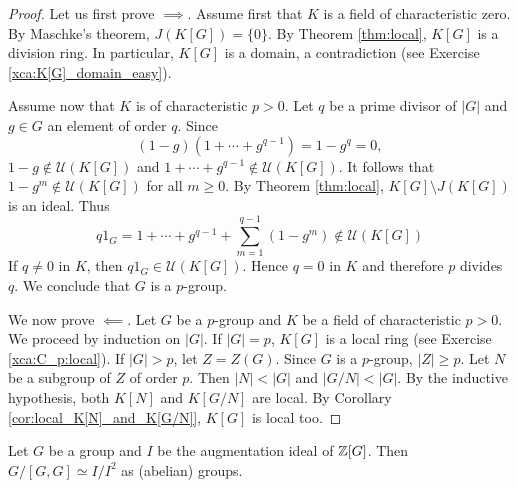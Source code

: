 \begin{proof}
    Let us first prove $\implies$. Assume first that $K$ is a field of characteristic zero. 
    By Maschke's theorem, $J(K[G])=\{0\}$. By Theorem \ref{thm:local}, 
    $K[G]$ is a division ring. In particular, $K[G]$ is a domain, 
    a contradiction (see Exercise \ref{xca:K[G]_domain_easy}).

    Assume now that $K$ is of characteristic $p>0$. 
    Let $q$ be a prime divisor of $|G|$ and $g\in G$ an element of order $q$. 
    Since 
    \[
    (1-g)(1+\cdots+g^{q-1})=1-g^q=0,
    \]
    $1-g\not\in\mathcal{U}(K[G])$ and $1+\cdots+g^{q-1}\not\in\mathcal{U}(K[G])$. It follows
    that $1-g^m\not\in\mathcal{U}(K[G])$ for all $m\geq0$. By Theorem \ref{thm:local}, 
    $K[G]\setminus J(K[G])$ is an ideal. Thus  
    \[
    q1_G=1+\cdots+g^{q-1}+\sum_{m=1}^{q-1}(1-g^m)\not\in\mathcal{U}(K[G])
    \]
    If $q\ne 0$ in $K$, then $q1_G\in\mathcal{U}(K[G])$. Hence $q=0$ in $K$ and
    therefore $p$ divides $q$. We conclude that $G$ is a $p$-group. 

    We now prove $\impliedby$. Let $G$ be a $p$-group and $K$ be a field of characteristic $p>0$. We proceed
    by induction on $|G|$. 
    If $|G|=p$, $K[G]$ is a local ring (see Exercise \ref{xca:C_p:local}).
    If $|G|>p$, let $Z=Z(G)$. Since $G$ is a $p$-group, $|Z|\geq p$. Let $N$ be a subgroup of $Z$ of order $p$. 
    Then $|N|<|G|$ and $|G/N|<|G|$. By the inductive hypothesis, both 
    $K[N]$ and $K[G/N]$ are local. By Corollary \ref{cor:local_K[N]_and_K[G/N]}, $K[G]$ is local too. 
\end{proof}


\begin{theorem}[Hurewicz]
    \label{thm:Hurewicz}
    Let $G$ be a group and $I$ be the augmentation ideal of $\mathbb{Z}[G]$. 
    Then $G/[G,G]\simeq I/I^2$ as (abelian) groups. 
\end{theorem}


